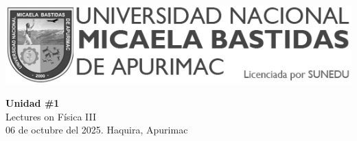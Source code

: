 


\begin{minipage}[l]{0.42\textwidth}
    \includegraphics[width=1\textwidth]{img/logo-UNAMBA.png}
\end{minipage}
\hfill
\begin{minipage}[c]{0.5\textwidth}
    \begin{flushright}
	\large{\textbf{Unidad \#1}}\\
	\large{Lectures on Física III}\\
	\large{06 de octubre del 2025. Haquira, Apurimac}\\
    \end{flushright}
\end{minipage}


  
